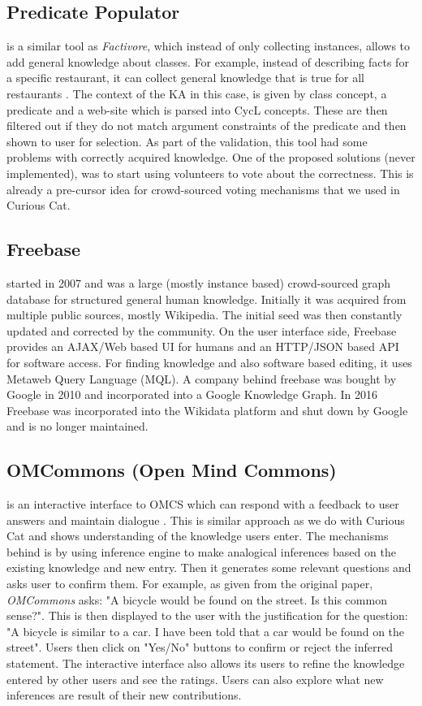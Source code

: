 \subsection{Predicate Populator} is a similar tool as \emph{Factivore}, which instead
of only collecting instances, allows to add general knowledge about classes. For
example, instead of describing facts for a specific restaurant, it can collect
general knowledge that is true for all restaurants \parencite{Witbrock2005}. The
context of the KA in this case, is given by class concept, a predicate and a 
web-site which is parsed into CycL concepts. These are then filtered out if they
do not match argument constraints of the predicate and then shown to user for 
selection. As part of the validation, this tool had some problems with correctly
acquired knowledge. One of the proposed solutions (never implemented), was to
start using volunteers to vote about the correctness. This is already a 
pre-cursor idea for crowd-sourced voting mechanisms that we used in Curious Cat.

\subsection{Freebase} started in 2007\parencite{Bollacker2008} and was a large (mostly
instance based) crowd-sourced graph database for structured general human 
knowledge. Initially it was acquired from multiple public sources, mostly 
Wikipedia. The initial seed was then constantly updated and corrected by the 
community. On the user interface side, Freebase provides an AJAX/Web based 
UI for humans and an HTTP/JSON based API for software access. For finding
knowledge and also software based editing, it uses Metaweb Query Language 
(MQL). A company behind freebase was bought by Google in 2010 and incorporated
into a Google Knowledge Graph. In 2016 Freebase was incorporated into the 
Wikidata platform and shut down by Google and is no longer maintained.

\subsection{OMCommons (Open Mind Commons)} is an interactive interface to OMCS which
can respond with a feedback to user answers and maintain dialogue 
\parencite{Speer2007}. This is similar approach as we do with Curious Cat and
shows understanding of the knowledge users enter. The mechanisms behind is
by using inference engine to make analogical inferences based on the existing 
knowledge and new entry. Then it generates some relevant questions and asks 
user to confirm them. For example, as given from the original paper, 
\emph{OMCommons} asks: "A bicycle would be found on the street. Is this common 
sense?". This is then displayed to the user with the justification for the 
question: "A bicycle is similar to a car. I have been told that a car would 
be found on the street". Users then click on "Yes/No" buttons to confirm or
reject the inferred statement. The interactive interface also allows its users 
to refine the knowledge entered by other users and see the ratings. Users can 
also explore what new inferences are result of their new contributions.

